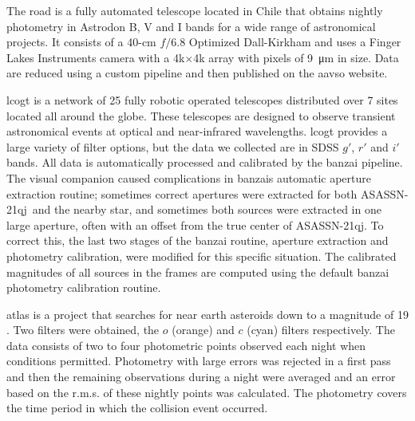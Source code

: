 \documentclass[sn-nature,oneside]{sn-jnl}%
\newcommand{\asas}{ASASSN-21qj}
\begin{document}

The \gls{road} \cite[][]{Hambsch12} is a fully automated telescope located in Chile that obtains nightly photometry in Astrodon B, V and I bands for a wide range of astronomical projects.
%
It consists of a 40-cm $f/6.8$ Optimized Dall-Kirkham and uses a Finger Lakes Instruments camera with a 4k$\times$4k array with pixels of \SI{9}{\micro\metre} in size.
%
Data are reduced using a custom pipeline and then published on the \gls{aavso} website.


\Gls{lcogt} is a network of 25 fully robotic operated telescopes distributed over 7 sites located all around the globe.
%
These telescopes are designed to observe transient astronomical events at optical and near-infrared wavelengths.
%
\gls{lcogt} provides a large variety of filter options, but the data we collected are in SDSS $g'$, $r'$ and $i'$ bands.
%
All data is automatically processed and calibrated by the \gls{banzai} pipeline.
%
The visual companion caused complications in \gls{banzai}s automatic aperture extraction routine; sometimes correct apertures were extracted for both \asas\ and the nearby star, and sometimes both sources were extracted in one large aperture, often with an offset from the true center of \asas.
%
To correct this, the last two stages of the \gls{banzai} routine, aperture extraction and photometry calibration, were modified for this specific situation. 
%
The calibrated magnitudes of all sources in the frames are computed using the default \gls{banzai} photometry calibration routine.


\gls{atlas} is a project that searches for near earth asteroids down to a magnitude of 19 \cite{Tonry18}.
%
Two filters were obtained, the $o$ (orange) and $c$ (cyan) filters respectively.
%
The data consists of two to four photometric points observed each night when conditions permitted.
%
Photometry with large errors was rejected in a first pass and then the remaining observations during a night were averaged and an error based on the r.m.s. of these nightly points was calculated.
%
The photometry covers the time period in which the collision event occurred. 
\end{document}
